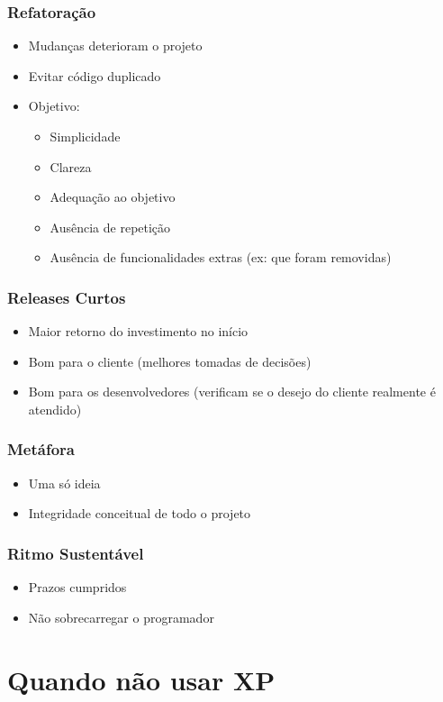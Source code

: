 \documentclass[10pt]{beamer}
\begin{document}
\begin{frame}
  \frametitle{Refatoração}
  \begin{itemize}
  \item Mudanças deterioram o projeto
  \item Evitar código duplicado
  \item Objetivo:
  \begin{itemize}
    \item Simplicidade
    \item Clareza
    \item Adequação ao objetivo
    \item Ausência de repetição
    \item Ausência de funcionalidades extras (ex: que foram removidas)
  \end{itemize}
  \end{itemize}
\end{frame}

\begin{frame}
  \frametitle{Releases Curtos}
  \begin{itemize}
  \item Maior retorno do investimento no início
  \item Bom para o cliente (melhores tomadas de decisões)
  \item Bom para os desenvolvedores (verificam se o desejo do cliente realmente é atendido)
  \end{itemize}
\end{frame}

\begin{frame}
  \frametitle{Metáfora}
  \begin{itemize}
  \item Uma só ideia
  \item Integridade conceitual de todo o projeto
  \end{itemize}
\end{frame}

\begin{frame}
  \frametitle{Ritmo Sustentável}
  \begin{itemize}
  \item Prazos cumpridos
  \item Não sobrecarregar o programador
  \end{itemize}
\end{frame}


\section{Quando não usar XP}
\end{document}
